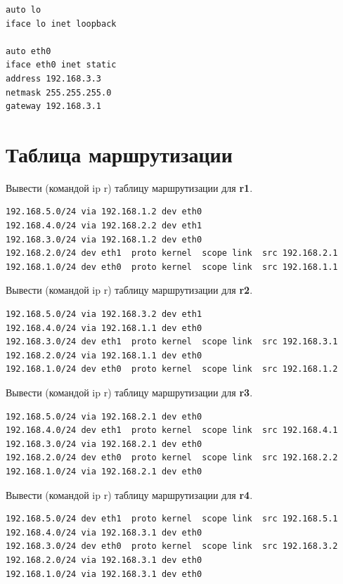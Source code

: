 \documentclass[a4paper,12pt]{article}
\begin{document}
\begin{Verbatim}
auto lo
iface lo inet loopback

auto eth0
iface eth0 inet static
address 192.168.3.3
netmask 255.255.255.0
gateway 192.168.3.1
\end{Verbatim}


\section{Таблица маршрутизации}

Вывести (командой ip r) таблицу маршрутизации для \textbf{r1}.

\begin{Verbatim}
192.168.5.0/24 via 192.168.1.2 dev eth0 
192.168.4.0/24 via 192.168.2.2 dev eth1 
192.168.3.0/24 via 192.168.1.2 dev eth0 
192.168.2.0/24 dev eth1  proto kernel  scope link  src 192.168.2.1 
192.168.1.0/24 dev eth0  proto kernel  scope link  src 192.168.1.1 
\end{Verbatim}

Вывести (командой ip r) таблицу маршрутизации для \textbf{r2}.

\begin{Verbatim}
192.168.5.0/24 via 192.168.3.2 dev eth1 
192.168.4.0/24 via 192.168.1.1 dev eth0 
192.168.3.0/24 dev eth1  proto kernel  scope link  src 192.168.3.1 
192.168.2.0/24 via 192.168.1.1 dev eth0 
192.168.1.0/24 dev eth0  proto kernel  scope link  src 192.168.1.2 
\end{Verbatim}

Вывести (командой ip r) таблицу маршрутизации для \textbf{r3}.

\begin{Verbatim}
192.168.5.0/24 via 192.168.2.1 dev eth0 
192.168.4.0/24 dev eth1  proto kernel  scope link  src 192.168.4.1 
192.168.3.0/24 via 192.168.2.1 dev eth0 
192.168.2.0/24 dev eth0  proto kernel  scope link  src 192.168.2.2 
192.168.1.0/24 via 192.168.2.1 dev eth0
\end{Verbatim}

Вывести (командой ip r) таблицу маршрутизации для \textbf{r4}.

\begin{Verbatim}
192.168.5.0/24 dev eth1  proto kernel  scope link  src 192.168.5.1 
192.168.4.0/24 via 192.168.3.1 dev eth0 
192.168.3.0/24 dev eth0  proto kernel  scope link  src 192.168.3.2 
192.168.2.0/24 via 192.168.3.1 dev eth0 
192.168.1.0/24 via 192.168.3.1 dev eth0
\end{Verbatim}
\end{document}
